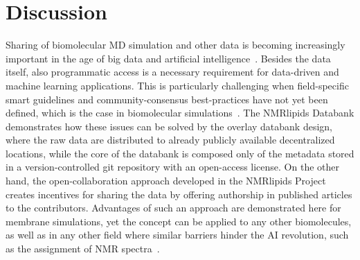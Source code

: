 \documentclass[fleqn,10pt]{wlscirep}
\begin{document}
\section{Discussion}


Sharing of biomolecular MD simulation and other data is becoming increasingly important in the age of big data and artificial intelligence~\cite{sever23,tiemann23}. 
Besides the data itself, also programmatic access is a necessary requirement for data-driven and machine learning applications. This is particularly challenging when field-specific smart guidelines and community-consensus best-practices have not yet been defined, which is the case in biomolecular simulations~\cite{tiemann23}.
The NMRlipids Databank demonstrates how these issues can be solved by the overlay databank design, where the raw data are distributed to already publicly available decentralized locations, while the core of the databank is composed only of the metadata stored in a version-controlled git repository with an open-access license. On the other hand, the open-collaboration approach developed in the NMRlipids Project~\cite{botan15} creates incentives for sharing the data by offering authorship in published articles to the contributors. Advantages of such an approach are demonstrated here for membrane simulations, yet the concept can be applied to any other biomolecules, %
as well as in any other field where similar barriers hinder the AI revolution, such as the assignment of NMR spectra~\cite{klukowski22}. 
\end{document}
